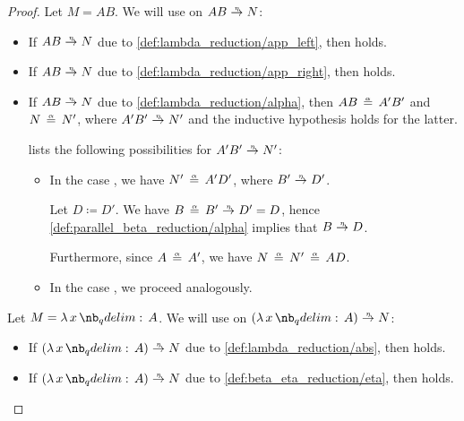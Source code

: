 \begin{proof}
   Let \( M = AB \). We will use  on \( AB \ered N \):
  \begin{itemize}
    \item If \( AB \ered N \) due to \ref{def:lambda_reduction/app_left}, then  holds.

    \item If \( AB \ered N \) due to \ref{def:lambda_reduction/app_right}, then  holds.

    \item If \( AB \ered N \) due to \ref{def:lambda_reduction/alpha}, then \( AB \aequiv A' B' \) and \( N \aequiv N' \), where \( A' B' \ered N' \) and the inductive hypothesis holds for the latter.

     lists the following possibilities for \( A' B' \ered N' \):
    \begin{itemize}
      \item In the case , we have \( N' \aequiv A' D' \), where \( B' \ered D' \).

      Let \( D \coloneqq D' \). We have \( B \aequiv B' \ered D' = D \), hence \ref{def:parallel_beta_reduction/alpha} implies that \( B \ered D \).

      Furthermore, since \( A \aequiv A' \), we have \( N \aequiv N' \aequiv A D \).

      \item In the case , we proceed analogously.
    \end{itemize}
  \end{itemize}

   Let \( M = \qabs x A \). We will use  on \( (\qabs x A) \ered N \):
  \begin{itemize}
    \item If \( (\qabs x A) \ered N \) due to \ref{def:lambda_reduction/abs}, then  holds.

    \item If \( (\qabs x A) \ered N \) due to \ref{def:beta_eta_reduction/eta}, then  holds.


\end{itemize}
\end{proof}
